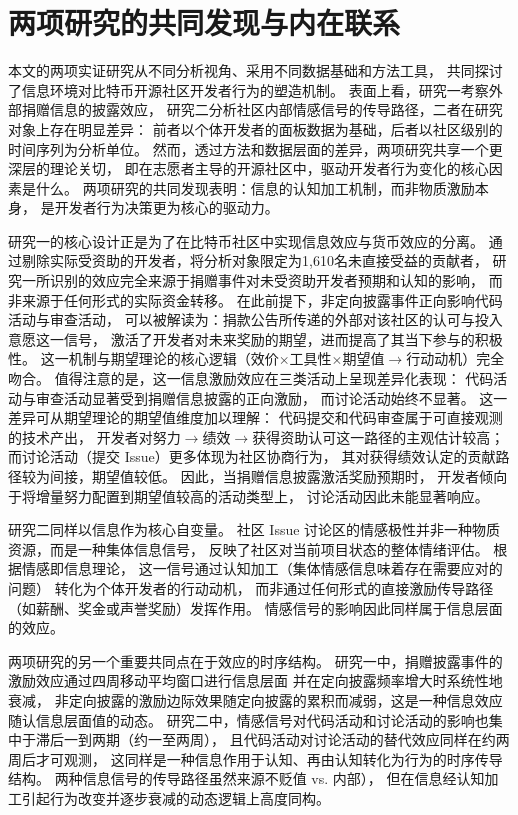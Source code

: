 \documentclass[
    type = master, %
    degree = professional,        %
    decl-page,  %
    twoside,                %
    fontset = fandol %
  ]{njuthesis}
\begin{document}
\section{两项研究的共同发现与内在联系}

本文的两项实证研究从不同分析视角、采用不同数据基础和方法工具，
共同探讨了信息环境对比特币开源社区开发者行为的塑造机制。
表面上看，研究一考察外部捐赠信息的披露效应，
研究二分析社区内部情感信号的传导路径，二者在研究对象上存在明显差异：
前者以个体开发者的面板数据为基础，后者以社区级别的时间序列为分析单位。
然而，透过方法和数据层面的差异，两项研究共享一个更深层的理论关切，
即在志愿者主导的开源社区中，驱动开发者行为变化的核心因素是什么。
两项研究的共同发现表明：信息的认知加工机制，而非物质激励本身，
是开发者行为决策更为核心的驱动力。

研究一的核心设计正是为了在比特币社区中实现信息效应与货币效应的分离。
通过剔除实际受资助的开发者，将分析对象限定为1,610名未直接受益的贡献者，
研究一所识别的效应完全来源于捐赠事件对未受资助开发者预期和认知的影响，
而非来源于任何形式的实际资金转移。
在此前提下，非定向披露事件正向影响代码活动与审查活动，
可以被解读为：捐款公告所传递的外部对该社区的认可与投入意愿这一信号，
激活了开发者对未来奖励的期望，进而提高了其当下参与的积极性。
这一机制与期望理论\cite{vroom1964work}的核心逻辑（效价$\times$工具性$\times$期望值$\to$行动动机）完全吻合。
值得注意的是，这一信息激励效应在三类活动上呈现差异化表现：
代码活动与审查活动显著受到捐赠信息披露的正向激励，
而讨论活动始终不显著。
这一差异可从期望理论的期望值维度加以理解：
代码提交和代码审查属于可直接观测的技术产出，
开发者对努力$\to$绩效$\to$获得资助认可这一路径的主观估计较高；
而讨论活动（提交 Issue）更多体现为社区协商行为，
其对获得绩效认定的贡献路径较为间接，期望值较低。
因此，当捐赠信息披露激活奖励预期时，
开发者倾向于将增量努力配置到期望值较高的活动类型上，
讨论活动因此未能显著响应。

研究二同样以信息作为核心自变量。
社区 Issue 讨论区的情感极性并非一种物质资源，而是一种集体信息信号，
反映了社区对当前项目状态的整体情绪评估。
根据情感即信息理论\cite{schwarz1983moods}，
这一信号通过认知加工（集体情感信息味着存在需要应对的问题）
转化为个体开发者的行动动机，
而非通过任何形式的直接激励传导路径（如薪酬、奖金或声誉奖励）发挥作用。
情感信号的影响因此同样属于信息层面的效应。

两项研究的另一个重要共同点在于效应的时序结构。
研究一中，捐赠披露事件的激励效应通过四周移动平均窗口进行信息层面
并在定向披露频率增大时系统性地衰减，
非定向披露的激励边际效果随定向披露的累积而减弱，这是一种信息效应随认信息层面值的动态。
研究二中，情感信号对代码活动和讨论活动的影响也集中于滞后一到两期（约一至两周），
且代码活动对讨论活动的替代效应同样在约两周后才可观测，
这同样是一种信息作用于认知、再由认知转化为行为的时序传导结构。
两种信息信号的传导路径虽然来源不贬值 vs. 内部），
但在信息经认知加工引起行为改变并逐步衰减的动态逻辑上高度同构。
\end{document}
